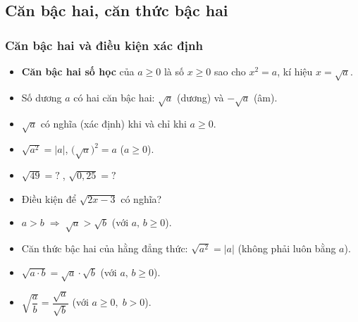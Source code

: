 \documentclass[12pt,a4paper]{article}
\begin{document}
\subsection{Căn bậc hai, căn thức bậc hai}

\subsubsection{Căn bậc hai và điều kiện xác định}

\begin{dinhnghia}
  \begin{itemize}
    \item \textbf{Căn bậc hai số học} của $a \ge 0$ là số $x \ge 0$ sao cho $x^2 = a$, kí hiệu $x = \sqrt{a}$.
    \item Số dương $a$ có hai căn bậc hai: $\sqrt{a}$ (dương) và $-\sqrt{a}$ (âm).
    \item $\sqrt{a}$ có nghĩa (xác định) khi và chỉ khi $a \ge 0$.
    \item $\sqrt{a^2} = |a|$, \quad $\bigl(\sqrt{a}\bigr)^2 = a$ \;($a \ge 0$).
  \end{itemize}
\end{dinhnghia}

\begin{vidu}
  \begin{itemize}
    \item $\sqrt{49} = ?\;$, \quad $\sqrt{0{,}25} = ?$
    \item Điều kiện để $\sqrt{2x - 3}$ có nghĩa?
  \end{itemize}
\end{vidu}

\begin{tinhchat}
  \begin{itemize}
    \item $a > b \;\Rightarrow\; \sqrt{a} > \sqrt{b}$ \quad (với $a,\, b \ge 0$).
    \item Căn thức bậc hai của hằng đẳng thức: $\sqrt{a^2} = |a|$ \quad (không phải luôn bằng $a$).
  \end{itemize}
\end{tinhchat}

\begin{congthuc}
  \begin{itemize}
    \item $\sqrt{a \cdot b} = \sqrt{a} \cdot \sqrt{b}$ \quad (với $a,\, b \ge 0$).
    \item $\sqrt{\dfrac{a}{b}} = \dfrac{\sqrt{a}}{\sqrt{b}}$ \quad (với $a \ge 0,\; b > 0$).
  \end{itemize}
\end{congthuc}
\end{document}
